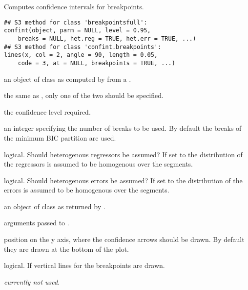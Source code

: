 \begin{Description}\relax
Computes confidence intervals for breakpoints.\end{Description}
\begin{Usage}
\begin{verbatim}
## S3 method for class 'breakpointsfull':
confint(object, parm = NULL, level = 0.95,
    breaks = NULL, het.reg = TRUE, het.err = TRUE, ...)
## S3 method for class 'confint.breakpoints':
lines(x, col = 2, angle = 90, length = 0.05,
    code = 3, at = NULL, breakpoints = TRUE, ...)
\end{verbatim}
\end{Usage}
\begin{Arguments}
\begin{ldescription}
\item[\code{object}] an object of class  as computed by
 from a .
\item[\code{parm}] the same as , only one of the two should be
specified.
\item[\code{level}] the confidence level required.
\item[\code{breaks}] an integer specifying the number of breaks to be used.
By default the breaks of the minimum BIC partition are used.
\item[\code{het.reg}] logical. Should heterogenous regressors be assumed? If set
to  the distribution of the regressors is assumed to be
homogenous over the segments.
\item[\code{het.err}] logical. Should heterogenous errors be assumed? If set
to  the distribution of the errors is assumed to be
homogenous over the segments.
\item[\code{x}] an object of class  as returned by
.
\item[\code{col, angle, length, code}] arguments passed to .
\item[\code{at}] position on the y axis, where the confidence arrows should be
drawn. By default they are drawn at the bottom of the plot.
\item[\code{breakpoints}] logical. If  vertical lines for the breakpoints
are drawn.
\item[\code{...}] \emph{currently not used}.
\end{ldescription}
\end{Arguments}
